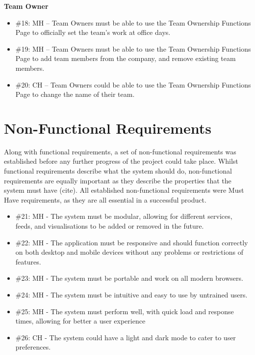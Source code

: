 \documentclass{l4proj}
\begin{document}
\textbf{Team Owner}
\begin{itemize}
    \item \#18: MH – Team Owners must be able to use the Team Ownership Functions Page to officially set the team's work at office days.
    \item \#19: MH – Team Owners must be able to use the Team Ownership Functions Page to add team members from the company, and remove existing team members.
    \item \#20: CH – Team Owners could be able to use the Team Ownership Functions Page to change the name of their team.
\end{itemize}


\section{Non-Functional Requirements}

Along with functional requirements, a set of non-functional requirements was established before any further progress of the project could take place. Whilst functional requirements describe what the system should do, non-functional requirements are equally important as they describe the properties that the system must have (cite). All established non-functional requirements were Must Have requirements, as they are all essential in a successful product.

\begin{itemize}
    \item \#21: MH - The system must be modular, allowing for different services, feeds, and visualisations to be added or removed in the future.
    \item \#22: MH - The application must be responsive and should function correctly on both desktop and mobile devices without any problems or restrictions of features.
    \item \#23: MH - The system must be portable and work on all modern browsers.
    \item \#24: MH - The system must be intuitive and easy to use by untrained users.
    \item \#25: MH - The system must perform well, with quick load and response times, allowing for better a user experience
    \item \#26: CH - The system could have a light and dark mode to cater to user preferences.
\end{itemize}




\end{document}
